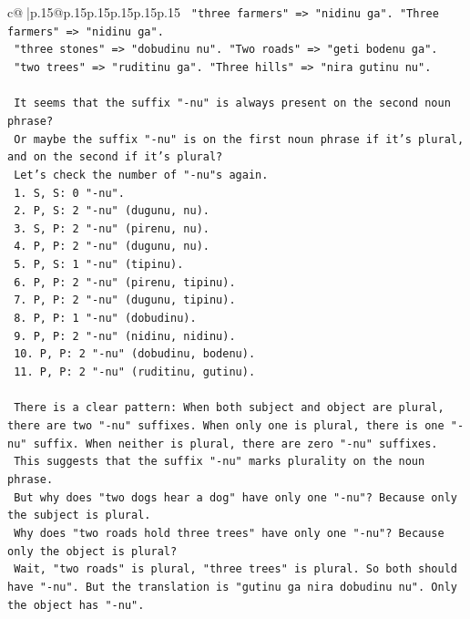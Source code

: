 \documentclass{article}
\begin{document}
{\begin{supertabular}{c@{$\;$}|p{.15\linewidth}@{}p{.15\linewidth}p{.15\linewidth}p{.15\linewidth}p{.15\linewidth}p{.15\linewidth}}
{{{\texttt{   "three farmers" => "nidinu ga". "Three farmers" => "nidinu ga".} \\
\texttt{   "three stones" => "dobudinu nu". "Two roads" => "geti bodenu ga".} \\
\texttt{   "two trees" => "ruditinu ga". "Three hills" => "nira gutinu nu".} \\
\\ 
\texttt{   It seems that the suffix "{-}nu" is always present on the second noun phrase?} \\
\texttt{   Or maybe the suffix "{-}nu" is on the first noun phrase if it's plural, and on the second if it's plural?} \\
\texttt{   Let's check the number of "{-}nu"s again.} \\
\texttt{   1. S, S: 0 "{-}nu".} \\
\texttt{   2. P, S: 2 "{-}nu" (dugunu, nu).} \\
\texttt{   3. S, P: 2 "{-}nu" (pirenu, nu).} \\
\texttt{   4. P, P: 2 "{-}nu" (dugunu, nu).} \\
\texttt{   5. P, S: 1 "{-}nu" (tipinu).} \\
\texttt{   6. P, P: 2 "{-}nu" (pirenu, tipinu).} \\
\texttt{   7. P, P: 2 "{-}nu" (dugunu, tipinu).} \\
\texttt{   8. P, P: 1 "{-}nu" (dobudinu).} \\
\texttt{   9. P, P: 2 "{-}nu" (nidinu, nidinu).} \\
\texttt{   10. P, P: 2 "{-}nu" (dobudinu, bodenu).} \\
\texttt{   11. P, P: 2 "{-}nu" (ruditinu, gutinu).} \\
\\ 
\texttt{   There is a clear pattern: When both subject and object are plural, there are two "{-}nu" suffixes. When only one is plural, there is one "{-}nu" suffix. When neither is plural, there are zero "{-}nu" suffixes.} \\
\texttt{   This suggests that the suffix "{-}nu" marks plurality on the noun phrase.} \\
\texttt{   But why does "two dogs hear a dog" have only one "{-}nu"? Because only the subject is plural.} \\
\texttt{   Why does "two roads hold three trees" have only one "{-}nu"? Because only the object is plural?} \\
\texttt{   Wait, "two roads" is plural, "three trees" is plural. So both should have "{-}nu". But the translation is "gutinu ga nira dobudinu nu". Only the object has "{-}nu".} \\
}}}
\end{supertabular}}
\end{document}
